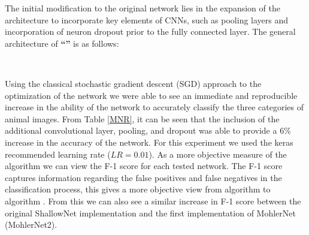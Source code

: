 \documentclass[12pt]{article}
\begin{document}
The initial modification to the original network lies in the expansion of the architecture to incorporate key elements of CNNs, such as pooling layers and incorporation of neuron dropout prior to the fully connected layer. The general architecture of \textbf{``''} is as follows: 
\begin{center}
	 \\
\end{center}
Using the classical stochastic gradient descent (SGD) approach to the optimization of the network we were able to see an immediate and reproducible increase in the ability of the network to accurately classify the three categories of animal images.  From Table \ref{MNR}, it can be seen that the inclusion of the additional convolutional layer, pooling, and dropout was able to provide a $6\%$ increase in the accuracy of the network. For this experiment we used the keras recommended learning rate ($LR = 0.01$). As a more objective measure of the algorithm we can view the F-1 score for each tested network. The F-1 score captures information regarding the false positives and false negatives in the classification process, this gives a more objective view from algorithm to algorithm . From this we can also see a similar increase in F-1 score between the original ShallowNet implementation and the first implementation of MohlerNet (MohlerNet2). 
\end{document}
